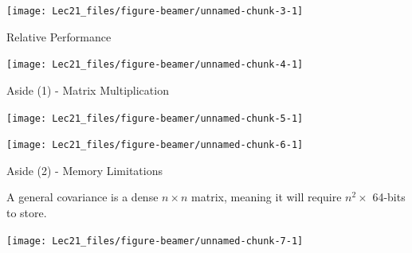 \documentclass[11pt,ignorenonframetext,]{beamer}
\begin{document}
\begin{frame}{}
\protect\hypertarget{section}{}

\begin{center}\texttt{[image: Lec21\_files/figure-beamer/unnamed-chunk-3-1]} \end{center}

\end{frame}

\begin{frame}{Relative Performance}
\protect\hypertarget{relative-performance}{}

\begin{center}\texttt{[image: Lec21\_files/figure-beamer/unnamed-chunk-4-1]} \end{center}

\end{frame}

\begin{frame}{Aside (1) - Matrix Multiplication}
\protect\hypertarget{aside-1---matrix-multiplication}{}

\begin{center}\texttt{[image: Lec21\_files/figure-beamer/unnamed-chunk-5-1]} \end{center}

\end{frame}

\begin{frame}{}
\protect\hypertarget{section-1}{}

\begin{center}\texttt{[image: Lec21\_files/figure-beamer/unnamed-chunk-6-1]} \end{center}

\end{frame}

\begin{frame}{Aside (2) - Memory Limitations}
\protect\hypertarget{aside-2---memory-limitations}{}

A general covariance is a dense \(n \times n\) matrix, meaning it will
require \(n^2 \times\) 64-bits to store.

\begin{center}\texttt{[image: Lec21\_files/figure-beamer/unnamed-chunk-7-1]} \end{center}

\end{frame}
\end{document}
